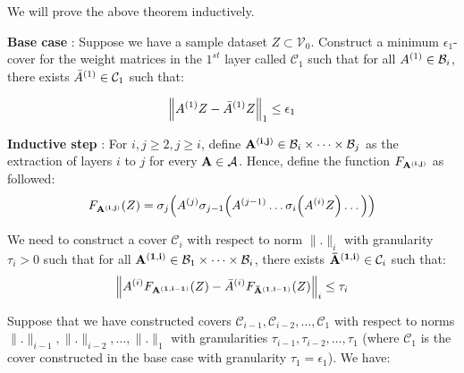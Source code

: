 \begin{proof*}
    \noindent We will prove the above theorem inductively. 
    
    \noindent\newline\textbf{Base case} : Suppose we have a sample dataset $Z\subset\mathcal{V}_0$. Construct a minimum $\epsilon_1$-cover for the weight matrices in the $1^{st}$ layer called $\mathcal{C}_1$ such that for all $A^{(1)}\in\mathcal{B}_i$, there exists ${\bar A}^{(1)}\in\mathcal{C}_1$ such that:

    \begin{align*}
        \Big\|A^{(1)}Z - {\bar A}^{(1)}Z\Big\|_1 \le \epsilon_1
    \end{align*} 
    
    
    \noindent \textbf{Inductive step} : For $i, j \ge 2, j \ge i$, define ${\bf A^{(i, j)}}\in\mathcal{B}_i\times\dots\times\mathcal{B}_j$ as the extraction of layers $i$ to $j$ for every ${\bf A}\in\mathcal{A}$. Hence, define the function $F_{\bf A^{(i, j)}}$ as followed:
    \begin{align*}
        F_{\bf A^{(i, j)}}(Z) = \sigma_j\Big( 
            A^{(j)}\sigma_{j-1}\Big( 
                A^{(j-1)}\dots\sigma_i\Big( A^{(i)}Z \Big)\dots
             \Big)
         \Big)
    \end{align*} 
    
    
    \noindent We need to construct a cover $\mathcal{C}_i$ with respect to norm $\|.\|_i$ with granularity $\tau_i>0$ such that for all ${\bf A^{(1, i)}}\in \mathcal{B}_1\times\dots\times\mathcal{B}_i$, there exists ${\bf {\bar A}^{(1, i)}}\in \mathcal{C}_{i}$ such that: 
    \begin{align*}
        \Big\|
            A^{(i)}F_{\bf A^{(1, i-1)}}(Z) - {\bar A}^{(i)}F_{\bf {\bar A}^{(1, i-1)}}(Z)
        \Big\|_i \le \tau_i
    \end{align*}

    \noindent Suppose that we have constructed covers $\mathcal{C}_{i-1}, \mathcal{C}_{i-2}, \dots, \mathcal{C}_1$ with respect to norms $\|.\|_{i-1}, \|.\|_{i-2}, \dots, \|.\|_1$ with granularities $\tau_{i-1}, \tau_{i-2}, \dots, \tau_1$ (where $\mathcal{C}_1$ is the cover constructed in the base case with \newline granularity $\tau_1=\epsilon_1$). We have:


\end{proof*}

